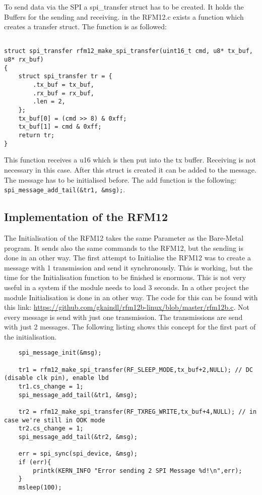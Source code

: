 To send data via the SPI a spi\_transfer struct has to be created. It holds the Buffers for the sending and receiving. in the RFM12.c exists a function which creates a transfer struct. The function is as followed: 

\begin{lstlisting}

struct spi_transfer rfm12_make_spi_transfer(uint16_t cmd, u8* tx_buf, u8* rx_buf)
{
	struct spi_transfer tr = {
		.tx_buf = tx_buf,
		.rx_buf = rx_buf,
		.len = 2,
	};
	tx_buf[0] = (cmd >> 8) & 0xff;
	tx_buf[1] = cmd & 0xff;
	return tr;
}                                                                                                                          
\end{lstlisting}
  
This function receives a u16 which is then put into the tx buffer. Receiving is not necessary in this case. After this struct is created it can be added to the message. The message has to be initialised before. The add function is the following: \verb|spi_message_add_tail(&tr1, &msg);|.

\subsection{Implementation of the RFM12}

The Initialisation of the RFM12 takes the same Parameter as the Bare-Metal program. It sends also the same commands to the RFM12, but the sending is done in an other way. The first attempt to Initialise the RFM12 was to create a message with 1 transmission and send it synchronously. This is working, but the time for the Initialisation function to be finished is enormous. This is not very useful in a system if the module needs to load 3 seconds. In a other project the module Initialisation is done in an other way. The code for this can be found with this link: \url{https://github.com/gkaindl/rfm12b-linux/blob/master/rfm12b.c}. \newline
Not every message is send with just one transmission. The transmissions are send with just 2 messages. The following listing shows this concept for the first part of the initialisation. 

\begin{lstlisting}
	spi_message_init(&msg);
	
	tr1 = rfm12_make_spi_transfer(RF_SLEEP_MODE,tx_buf+2,NULL); // DC (disable clk pin), enable lbd
	tr1.cs_change = 1;
	spi_message_add_tail(&tr1, &msg);
	
	tr2 = rfm12_make_spi_transfer(RF_TXREG_WRITE,tx_buf+4,NULL); // in case we're still in OOK mode
	tr2.cs_change = 1;
	spi_message_add_tail(&tr2, &msg); 
		
	err = spi_sync(spi_device, &msg);
	if (err){
		printk(KERN_INFO "Error sending 2 SPI Message %d!\n",err);
	}
	msleep(100);
                                                                                                                          
\end{lstlisting}


